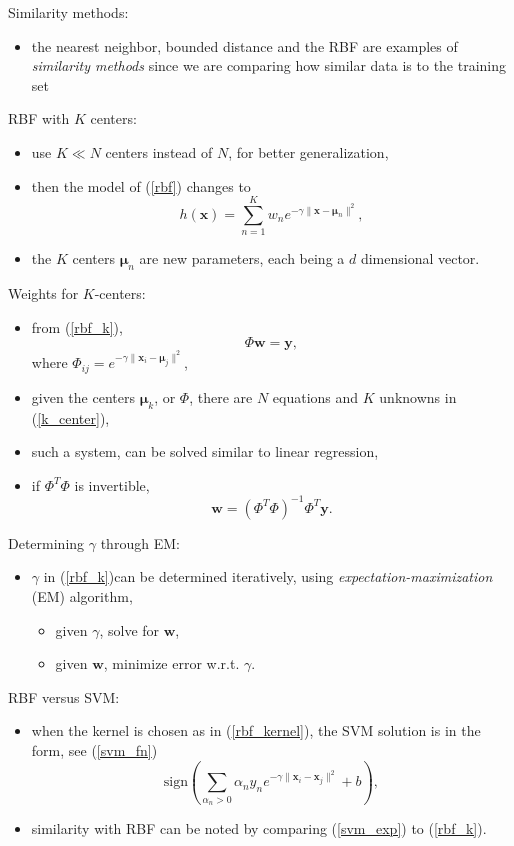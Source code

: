 \documentclass[onecolumn]{IEEEtran}
\newcommand{\beq}{\begin{equation}}
\newcommand{\eeq}{\end{equation}}
\newcommand{\bi}{\begin{itemize}}
\newcommand{\ei}{\end{itemize}}
\begin{document}
\begin{itemize}
    \ei
    \item Similarity methods:
    \bi
        \item the nearest neighbor, bounded distance and the RBF are examples of \emph{similarity methods} since we are comparing how similar data is to the training set
    \ei
    \item RBF with $K$ centers:
    \bi
        \item use $K \ll N$ centers instead of $N$, for better generalization,
        \item then the model of (\ref{rbf}) changes to
         \beq\label{rbf_k}
            h(\bm{x}) = \sum_{n=1}^{K} w_n e^{-\gamma \|\bm{x}-\bm{\mu}_n\|^2},
        \eeq
        \item the $K$ centers $\bm{\mu}_n$ are new parameters, each being a $d$ dimensional vector.
    \ei
    \item Weights for $K$-centers:
    \bi
        \item from (\ref{rbf_k}),
        \beq\label{k_center}
            \Phi \bm{w} = \bm{y},
        \eeq
        where $\Phi_{ij} = e^{-\gamma \|\bm{x}_i-\bm{\mu}_j\|^2}$,
        \item given the centers $\bm{\mu}_k$, or $\Phi$, there are $N$ equations and $K$ unknowns in (\ref{k_center}),
        \item such a system, can be solved similar to linear regression,
        \item if $\Phi^T\Phi$ is invertible,
        \beq
            \bm{w} = (\Phi^T\Phi)^{-1}\Phi^T \bm{y}.
        \eeq
    \ei
    \item Determining $\gamma$ through EM:
    \bi
        \item $\gamma$ in (\ref{rbf_k})can be determined iteratively, using \emph{expectation-maximization} (EM) algorithm,
        \bi
            \item given $\gamma$, solve for $\bm{w}$,
            \item given $\bm{w}$, minimize error w.r.t. $\gamma$.
        \ei
    \ei
    \item RBF versus SVM:
    \bi
        \item when the kernel is chosen as in (\ref{rbf_kernel}), the SVM solution is in the form, see (\ref{svm_fn})
        \beq\label{svm_exp}
            \text{sign}\left(\sum_{\alpha_n > 0} \alpha_n y_n e^{-\gamma \|\bm{x}_i-\bm{x}_j\|^2} + b\right),
        \eeq
        \item similarity with RBF can be noted by comparing (\ref{svm_exp}) to (\ref{rbf_k}).

\end{itemize}
\end{document}
